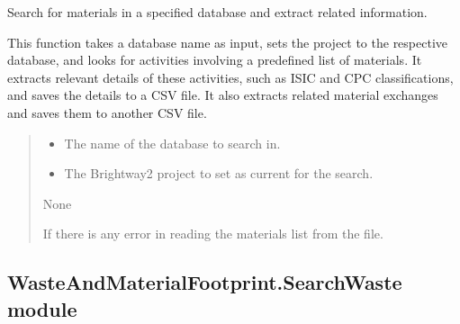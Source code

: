 \documentclass[letterpaper,10pt,english]{sphinxmanual}
\begin{document}
\begin{fulllineitems}
\label{\detokenize{WMFootprint_api:WasteAndMaterialFootprint.SearchMaterial.SearchMaterial}}
\pysigstartsignatures
{}
\pysigstopsignatures
\sphinxAtStartPar
Search for materials in a specified database and extract related information.

\sphinxAtStartPar
This function takes a database name as input, sets the project to the respective database,
and looks for activities involving a predefined list of materials. It extracts relevant details
of these activities, such as ISIC and CPC classifications, and saves the details to a CSV file.
It also extracts related material exchanges and saves them to another CSV file.
\begin{quote}\begin{description}
\begin{itemize}
\item {} 
\sphinxAtStartPar
{} \textendash{} The name of the database to search in.

\item {} 
\sphinxAtStartPar
{} \textendash{} The Brightway2 project to set as current for the search.

\end{itemize}

\sphinxAtStartPar
None

\sphinxAtStartPar
{} \textendash{} If there is any error in reading the materials list from the file.

\end{description}\end{quote}

\end{fulllineitems}



\subsection{WasteAndMaterialFootprint.SearchWaste module}
\label{\detokenize{WMFootprint_api:module-WasteAndMaterialFootprint.SearchWaste}}\label{\detokenize{WMFootprint_api:wasteandmaterialfootprint-searchwaste-module}}
\end{document}
